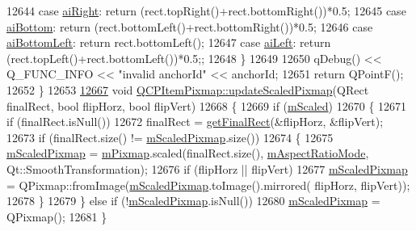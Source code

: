 \begin{DoxyCode}
12644     \textcolor{keywordflow}{case} \hyperlink{a00037_a0ea7f65edb7395e02de521915f221174ab22d91dae59c0d4a65416a0d677b2d05}{aiRight}:       \textcolor{keywordflow}{return} (rect.topRight()+rect.bottomRight())*0.5;
12645     \textcolor{keywordflow}{case} \hyperlink{a00037_a0ea7f65edb7395e02de521915f221174a04b5e041b4dd0def2b60c5cfea2bc1a4}{aiBottom}:      \textcolor{keywordflow}{return} (rect.bottomLeft()+rect.bottomRight())*0.5;
12646     \textcolor{keywordflow}{case} \hyperlink{a00037_a0ea7f65edb7395e02de521915f221174ae14886b381136898e37e89af5046a1cc}{aiBottomLeft}:  \textcolor{keywordflow}{return} rect.bottomLeft();
12647     \textcolor{keywordflow}{case} \hyperlink{a00037_a0ea7f65edb7395e02de521915f221174a9efe71239b9409ebe1c2813a37807f2a}{aiLeft}:        \textcolor{keywordflow}{return} (rect.topLeft()+rect.bottomLeft())*0.5;;
12648   \}
12649   
12650   qDebug() << Q\_FUNC\_INFO << \textcolor{stringliteral}{"invalid anchorId"} << anchorId;
12651   \textcolor{keywordflow}{return} QPointF();
12652 \}
12653 
\hypertarget{a00115_source_l12667}{}\hyperlink{a00037_a8bced3027b326b290726cd1979c7cfc6}{12667} \textcolor{keywordtype}{void} \hyperlink{a00037_a8bced3027b326b290726cd1979c7cfc6}{QCPItemPixmap::updateScaledPixmap}(QRect finalRect, \textcolor{keywordtype}{bool} flipHorz, \textcolor{keywordtype}{
      bool} flipVert)
12668 \{
12669   \textcolor{keywordflow}{if} (\hyperlink{a00037_a8fe670a529cd46a9b8afd9fc1203bc3f}{mScaled})
12670   \{
12671     \textcolor{keywordflow}{if} (finalRect.isNull())
12672       finalRect = \hyperlink{a00037_a245ef0c626cab7096a810442f2f6a2d9}{getFinalRect}(&flipHorz, &flipVert);
12673     \textcolor{keywordflow}{if} (finalRect.size() != \hyperlink{a00037_a2ebc66e15b9f1264563d58f29ba1bc00}{mScaledPixmap}.size())
12674     \{
12675       \hyperlink{a00037_a2ebc66e15b9f1264563d58f29ba1bc00}{mScaledPixmap} = \hyperlink{a00037_a1396cce7f26c7b8e9512906284380c4d}{mPixmap}.scaled(finalRect.size(), 
      \hyperlink{a00037_a8dc6b6c1e106ac523efae22d5fe55bab}{mAspectRatioMode}, Qt::SmoothTransformation);
12676       \textcolor{keywordflow}{if} (flipHorz || flipVert)
12677         \hyperlink{a00037_a2ebc66e15b9f1264563d58f29ba1bc00}{mScaledPixmap} = QPixmap::fromImage(\hyperlink{a00037_a2ebc66e15b9f1264563d58f29ba1bc00}{mScaledPixmap}.toImage().mirrored(
      flipHorz, flipVert));
12678     \}
12679   \} \textcolor{keywordflow}{else} \textcolor{keywordflow}{if} (!\hyperlink{a00037_a2ebc66e15b9f1264563d58f29ba1bc00}{mScaledPixmap}.isNull())
12680     \hyperlink{a00037_a2ebc66e15b9f1264563d58f29ba1bc00}{mScaledPixmap} = QPixmap();
12681 \}

\end{DoxyCode}
